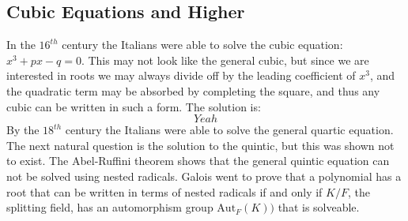 \documentclass{article}                                                        %
\begin{document}
        \subsection{Cubic Equations and Higher}
            In the $16^{th}$ century the Italians were able to solve the cubic
            equation: $x^{3}+px-q=0$. This may not look like the general cubic,
            but since we are interested in roots we may always divide off by
            the leading coefficient of $x^{3}$, and the quadratic term may be
            absorbed by completing the square, and thus any cubic can be
            written in such a form. The solution is:
            \begin{equation}
                Yeah
            \end{equation}
            By the $18^{th}$ century the Italians were able to solve the general
            quartic equation. The next natural question is the solution to the
            quintic, but this was shown not to exist. The Abel-Ruffini theorem
            shows that the general quintic equation can not be solved using
            nested radicals. Galois went to prove that a polynomial has a root
            that can be written in terms of nested radicals if and only if
            $K/F$, the splitting field, has an automorphism group
            $\textrm{Aut}_{F}(K))$ that is solveable.
\end{document}

